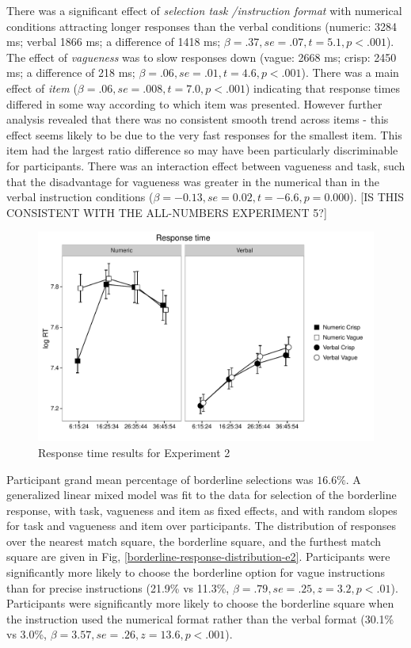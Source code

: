 \documentclass[
a4paper 
, doc
, longtable
]{apa6}
\begin{document}
There was a significant effect of \emph{selection task /instruction format} with numerical conditions attracting longer responses than the verbal conditions (numeric: 3284 ms; verbal 1866 ms; a difference of 1418 ms; $\beta=.37, se=.07, t=5.1, p<.001$). 
% 
The effect of \emph{vagueness} was to slow responses down (vague: 2668 ms; crisp: 2450 ms; a difference of 218 ms; $\beta=.06, se=.01, t=4.6, p<.001$). 
%
There was a main effect of \emph{item} ($\beta=.06, se=.008, t=7.0, p<.001$) indicating that response times differed in some way according to which item was presented. However further analysis revealed that there was no consistent smooth trend across items - this effect seems likely to be due to the very fast responses for the smallest item. This item had the largest ratio difference so may have been particularly discriminable for participants. %
%
There was an interaction effect between vagueness and task, such that the disadvantage for vagueness was greater in the numerical than in the verbal instruction conditions ($\beta=-0.13, se= 0.02, t= -6.6, p=0.000$).  [IS THIS CONSISTENT WITH THE ALL-NUMBERS EXPERIMENT 5?]

\begin{figure}[htbp]
\centering
\includegraphics[width=.65\textwidth]{images/response-time-sep-1.pdf}
\caption{Response time results for Experiment 2}
\label{resultse2}
\end{figure}

Participant grand mean percentage of borderline selections was $16.6\%$. A generalized linear mixed model \cite{jaeger2008categorical} was fit to the data for selection of the borderline response, with task, vagueness and item as fixed effects, and with random slopes for task and vagueness and item over participants.  
%
The distribution of responses over the nearest match square, the borderline square, and the furthest match square are given in Fig, \ref{borderline-response-distribution-e2}.
%
Participants were significantly more likely to choose the borderline option for vague instructions than for precise instructions (21.9\% vs 11.3\%, $\beta=.79, se=.25, z=3.2, p<.01$). Participants were significantly more likely to choose the borderline square when the instruction used the numerical format rather than the verbal format (30.1\% vs 3.0\%, $\beta=3.57, se=.26, z=13.6, p<.001$). 
\end{document}
